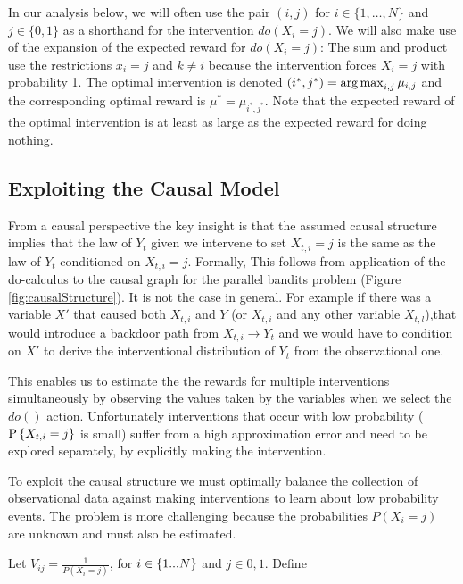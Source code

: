 In our analysis below, we will often use the pair $(i,j)$ for $i \in \{1, \ldots, N\}$ and $j \in \{0,1\}$ as a shorthand for the intervention $do(X_i = j)$.
We will also make use of the expansion of the expected reward for $do(X_i = j)$:
The sum and product use the restrictions $x_i = j$ and $k \ne i$ because the intervention forces $X_i = j$ with probability 1.
The optimal intervention is denoted $(i^*,j^*) = \argmax_{i,j} \mu_{i,j}$ and the corresponding optimal reward is $\mu^* = \mu_{i^*,j^*}$. 
Note that the expected reward of the optimal intervention is at least as large as the expected reward for doing nothing.



\subsection{Exploiting the Causal Model}

From a causal perspective the key insight is that the assumed causal structure implies that
the law of $Y_t$ given we intervene to set $X_{t,i} = j$ is the same as the law of $Y_t$ conditioned
on $X_{t,i} = j$. Formally,
This follows from application of the do-calculus \cite{Pearl2000} to the causal graph for the parallel bandits problem (Figure \ref{fig:causalStructure}). It is not the case in general. 
For example if there was a variable $X'$ that caused both $X_{t,i}$ and $Y$ (or $X_{t,i}$ and any other variable $X_{t,l}$),that would introduce a backdoor path from $X_{t,i} \rightarrow Y_t$ and we would have to condition on $X'$ to derive the interventional distribution of $Y_t$ from the observational one.

This enables us to estimate the the rewards for multiple interventions simultaneously by observing the values taken by the variables when we select the $do()$ action. Unfortunately interventions that occur with low probability ($\P{X_{t,i} = j}$ is small) suffer from a high approximation error and need to be explored separately, by explicitly making the intervention. 

To exploit the causal structure we must optimally balance the collection of observational data against making interventions to learn about low probability events. The problem is more challenging because the probabilities $P(X_i=j)$ are unknown and must also be estimated.

\begin{definition}
Let $V_{ij} = \frac{1}{P(X_i = j)}$, for $i \in \set{1...N}$ and $j \in {0,1}$. 
Define 
\end{definition}
